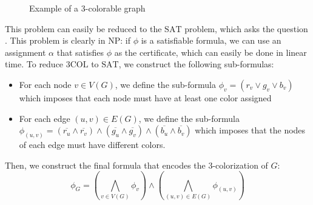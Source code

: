 \begin{figure}[H]
    \centering
    
    
    \caption{Example of a 3-colorable graph}
\end{figure}

This problem can easily be reduced to the $\mathrm{SAT}$ problem, which asks the question . This problem is clearly in \textsf{NP}: if $\phi$ is a satisfiable formula, we can use an assignment $\alpha$ that satisfies $\phi$ as the certificate, which can easily be done in linear time. To reduce $3\mathrm{COL}$ to $\mathrm{SAT}$, we construct the following sub-formulas:
\begin{itemize}
    \item For each node $v \in V(G)$, we define the sub-formula $\phi_v = (r_v \lor g_v \lor b_v)$ which imposes that each node must have at least one color assigned
    \item For each edge $(u,v) \in E(G)$, we define the sub-formula $\phi_{(u,v)} = (\overline{r_u} \land \overline{r_v}) \land (\overline{g_u} \land \overline{g_v}) \land (\overline{b_u} \land \overline{b_v})$ which imposes that the nodes of each edge must have different colors.
\end{itemize}

Then, we construct the final formula that encodes the 3-colorization of $G$:
\[\phi_G = \left ( \bigwedge_{v \in V(G)} \phi_v \right ) \land \left ( \bigwedge_{(u,v) \in E(G)} \phi_{(u,v)} \right )\]

